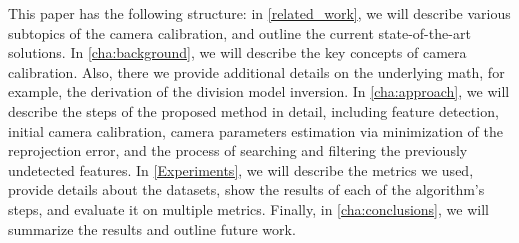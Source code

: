This paper has the following structure: in \cref{related_work}, we will describe
various subtopics of the camera calibration, and outline the current state-of-the-art solutions.
In \cref{cha:background}, we will describe the key concepts of camera
calibration. Also, there we provide additional details on the underlying math,
for example, the derivation of the division model inversion. In
\cref{cha:approach}, we will describe the steps of the proposed method in
detail, including feature detection, initial camera calibration, camera
parameters estimation via minimization of the reprojection error, and the
process of searching and filtering the previously undetected features. In
\cref{Experiments}, we will describe the metrics we used, provide details about
the datasets, show the results of each of the algorithm's steps, and evaluate it
on multiple metrics. Finally, in \cref{cha:conclusions}, we will summarize the
results and outline future work.


